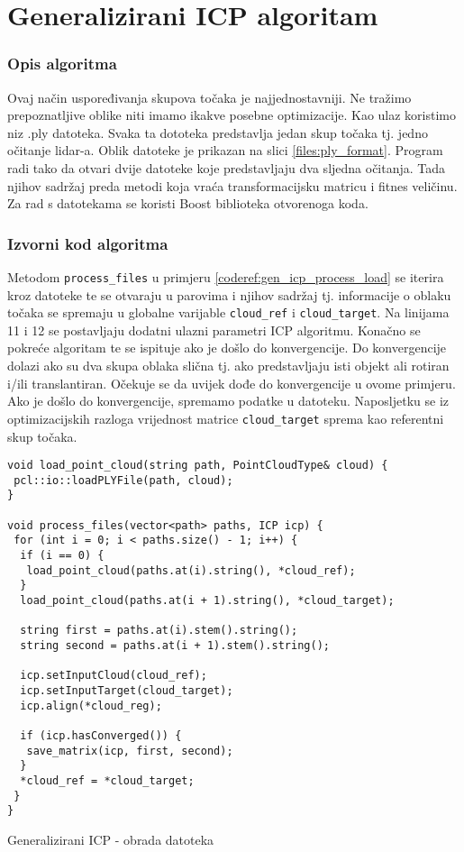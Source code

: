 \section{Generalizirani ICP algoritam}

\subsubsection{Opis algoritma}
Ovaj način uspoređivanja skupova točaka je najjednostavniji. Ne tražimo prepoznatljive oblike niti imamo ikakve posebne optimizacije. Kao ulaz koristimo niz .ply datoteka. Svaka ta dototeka predstavlja jedan skup točaka tj. jedno očitanje lidar-a. Oblik datoteke je prikazan na slici \ref{files:ply_format}. Program radi tako da otvari dvije datoteke koje predstavljaju dva sljedna očitanja. Tada njihov sadržaj preda metodi koja vraća transformacijsku matricu i fitnes veličinu. Za rad s datotekama se koristi Boost biblioteka otvorenoga koda.


\subsubsection{Izvorni kod algoritma}
Metodom \texttt{process_files} u primjeru \ref{coderef:gen_icp_process_load} se iterira kroz datoteke te se otvaraju u parovima i njihov sadržaj tj. informacije o oblaku točaka se spremaju u globalne varijable \texttt{cloud_ref} i \texttt{cloud_target}. Na linijama 11 i 12 se postavljaju  dodatni ulazni parametri ICP algoritmu. Konačno se pokreće algoritam te se ispituje ako je došlo do konvergencije. Do konvergencije dolazi ako su dva skupa oblaka slična tj. ako predstavljaju isti objekt ali rotiran i/ili translantiran. Očekuje se da uvijek dođe do konvergencije u ovome primjeru. Ako je došlo do konvergencije, spremamo podatke u datoteku. Naposljetku se iz optimizacijskih razloga vrijednost matrice \texttt{cloud_target} sprema kao referentni skup točaka.
\begin{listing}[H]
  \begin{verbatim}
void load_point_cloud(string path, PointCloudType& cloud) {
 pcl::io::loadPLYFile(path, cloud);
}

void process_files(vector<path> paths, ICP icp) {
 for (int i = 0; i < paths.size() - 1; i++) {
  if (i == 0) {
   load_point_cloud(paths.at(i).string(), *cloud_ref);
  }
  load_point_cloud(paths.at(i + 1).string(), *cloud_target);

  string first = paths.at(i).stem().string();
  string second = paths.at(i + 1).stem().string();

  icp.setInputCloud(cloud_ref);
  icp.setInputTarget(cloud_target);
  icp.align(*cloud_reg);

  if (icp.hasConverged()) {
   save_matrix(icp, first, second);
  }
  *cloud_ref = *cloud_target;
 }
}
  \end{verbatim}
  \caption{Generalizirani ICP - obrada datoteka}
  \label{coderef:gen_icp_process_load}
\end{listing}
\pagebreak